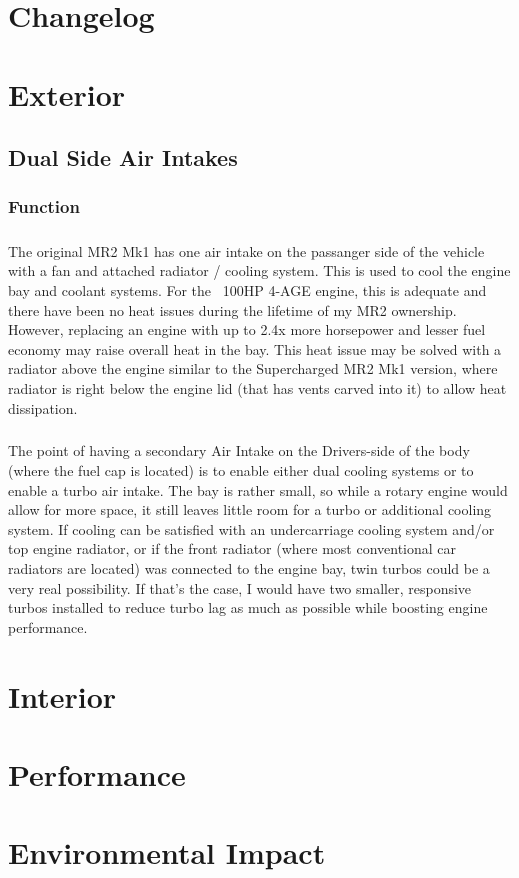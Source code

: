 \documentclass[a4paper,10pt]{report}
\title{}
\author{}
\begin{document}
\maketitle

\begin{abstract}
\end{abstract}

\chapter{Changelog}
\chapter{Exterior}
\section{Dual Side Air Intakes}
\subsection{Function}
\paragraph*{}The original MR2 Mk1 has one air intake on the passanger side of the vehicle with a fan and attached radiator / cooling system. This is used to cool the engine bay and coolant systems. For the ~100HP 4-AGE engine, this is adequate and there have been no heat issues during the lifetime of my MR2 ownership. However, replacing an engine with up to 2.4x more horsepower and lesser fuel economy may raise overall heat in the bay. This heat issue may be solved with a radiator above the engine similar to the Supercharged MR2 Mk1 version, where radiator is right below the engine lid (that has vents carved into it) to allow heat dissipation. 

\paragraph*{}The point of having a secondary Air Intake on the Drivers-side of the body (where the fuel cap is located) is to enable either dual cooling systems or to enable a turbo air intake. The bay is rather small, so while a rotary engine would allow for more space, it still leaves little room for a turbo or additional cooling system. If cooling can be satisfied with an undercarriage cooling system and/or top engine radiator, or if the front radiator (where most conventional car radiators are located) was connected to the engine bay, twin turbos could be a very real possibility. If that's the case, I would have two smaller, responsive turbos installed to reduce turbo lag as much as possible while boosting engine performance.


\chapter{Interior}
\chapter{Performance}
\chapter{Environmental Impact}
\end{document}
